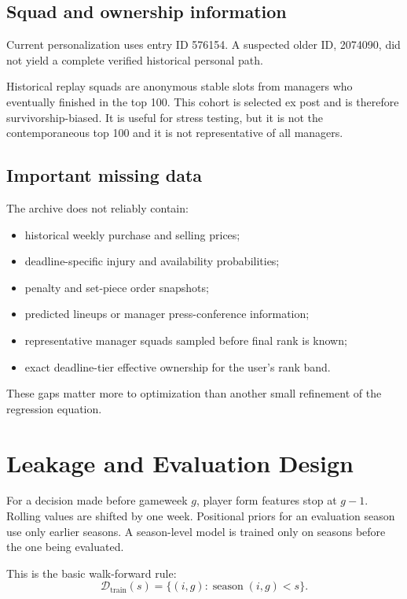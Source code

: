 \documentclass[11pt,a4paper]{article}
\begin{document}
\subsection{Squad and ownership information}

Current personalization uses entry ID 576154. A suspected older ID, 2074090, did not yield a complete verified historical personal path.

Historical replay squads are anonymous stable slots from managers who eventually finished in the top 100. This cohort is selected ex post and is therefore survivorship-biased. It is useful for stress testing, but it is not the contemporaneous top 100 and it is not representative of all managers.

\subsection{Important missing data}

The archive does not reliably contain:

\begin{itemize}
  \item historical weekly purchase and selling prices;
  \item deadline-specific injury and availability probabilities;
  \item penalty and set-piece order snapshots;
  \item predicted lineups or manager press-conference information;
  \item representative manager squads sampled before final rank is known;
  \item exact deadline-tier effective ownership for the user's rank band.
\end{itemize}

These gaps matter more to optimization than another small refinement of the regression equation.

\section{Leakage and Evaluation Design}

For a decision made before gameweek $g$, player form features stop at $g-1$. Rolling values are shifted by one week. Positional priors for an evaluation season use only earlier seasons. A season-level model is trained only on seasons before the one being evaluated.

This is the basic walk-forward rule:
\begin{equation}
  \mathcal{D}_{\text{train}}(s)=\{(i,g):\operatorname{season}(i,g)<s\}.
\end{equation}
\end{document}

